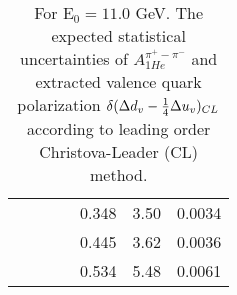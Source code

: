\begin{table}[htbp]
\begin{center}
\begin{tabular}{|ccccc||c|c|}
         &          &          &          &    0.348 &      3.50 &    0.0034 \\
         &          &          &          &    0.445 &      3.62 &    0.0036 \\
         &          &          &          &    0.534 &      5.48 &    0.0061 \\
\hline
\end{tabular}
\end{center}
\caption{\label{tab:ddv1}  For E$_0=11.0 $ GeV. 
The expected statistical uncertainties of   $A_{1He}^{\pi^+ - \pi^-}$ and  extracted valence quark polarization $\delta ( \Delta d_v -{1 \over 4} \Delta u_v )_{CL}$
according to leading order Christova-Leader (CL) method. 
}
\end{table}
%
%
%
%
